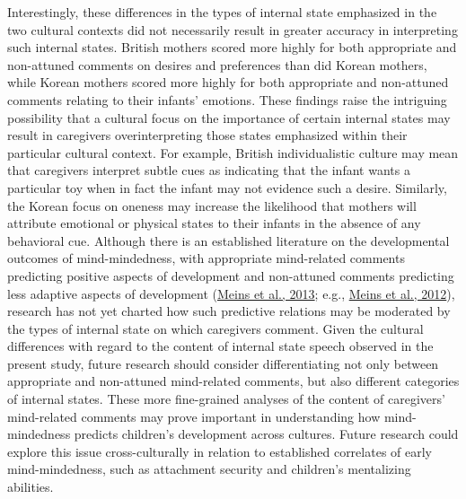 \documentclass[
]{article}
\begin{document}
Interestingly, these differences in the types of internal state emphasized in the two cultural contexts did not necessarily result in greater accuracy in interpreting such internal states. British mothers scored more highly for both appropriate and non-attuned comments on desires and preferences than did Korean mothers, while Korean mothers scored more highly for both appropriate and non-attuned comments relating to their infants' emotions. These findings raise the intriguing possibility that a cultural focus on the importance of certain internal states may result in caregivers overinterpreting those states emphasized within their particular cultural context. For example, British individualistic culture may mean that caregivers interpret subtle cues as indicating that the infant wants a particular toy when in fact the infant may not evidence such a desire. Similarly, the Korean focus on oneness may increase the likelihood that mothers will attribute emotional or physical states to their infants in the absence of any behavioral cue. Although there is an established literature on the developmental outcomes of mind-mindedness, with appropriate mind-related comments predicting positive aspects of development and non-attuned comments predicting less adaptive aspects of development (\protect\hyperlink{ref-Meins2013}{Meins et al., 2013}; e.g., \protect\hyperlink{ref-Meins2012}{Meins et al., 2012}), research has not yet charted how such predictive relations may be moderated by the types of internal state on which caregivers comment. Given the cultural differences with regard to the content of internal state speech observed in the present study, future research should consider differentiating not only between appropriate and non-attuned mind-related comments, but also different categories of internal states. These more fine-grained analyses of the content of caregivers' mind-related comments may prove important in understanding how mind-mindedness predicts children's development across cultures. Future research could explore this issue cross-culturally in relation to established correlates of early mind-mindedness, such as attachment security and children's mentalizing abilities.
\end{document}
